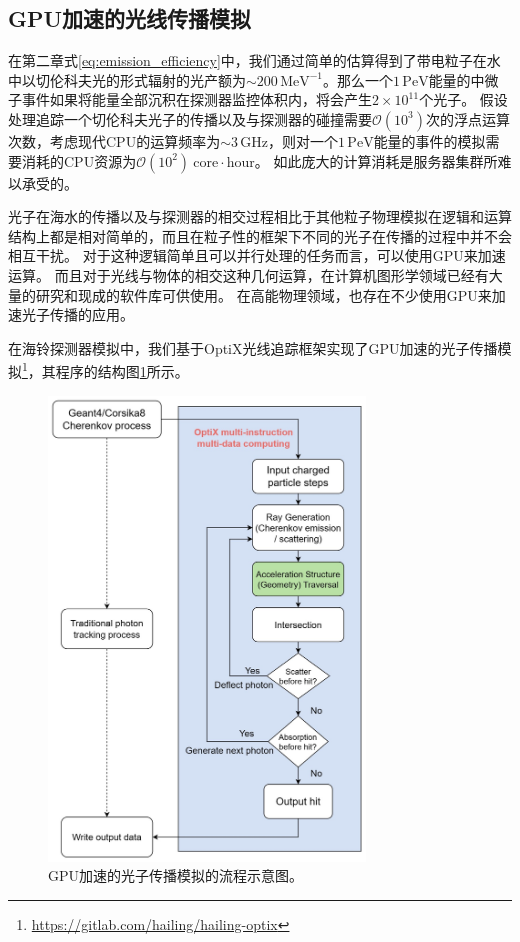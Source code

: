 \subsection{GPU加速的光线传播模拟}
\label{subsec:ray_tracing}

在第二章式\ref{eq:emission_efficiency}中，我们通过简单的估算得到了带电粒子在水中以切伦科夫光的形式辐射的光产额为$\sim 200\, \mathrm{MeV}^{-1}$。那么一个$1\,\mathrm{PeV}$能量的中微子事件如果将能量全部沉积在探测器监控体积内，将会产生$2 \times 10^{11}$个光子。
假设处理追踪一个切伦科夫光子的传播以及与探测器的碰撞需要$\mathcal{O}(10^3)$次的浮点运算次数，考虑现代CPU的运算频率为$\sim 3\,\mathrm{GHz}$，则对一个$1\,\mathrm{PeV}$能量的事件的模拟需要消耗的CPU资源为$\mathcal{O}(10^2) ~ \mathrm{core \cdot hour}$。
如此庞大的计算消耗是服务器集群所难以承受的。

光子在海水的传播以及与探测器的相交过程相比于其他粒子物理模拟在逻辑和运算结构上都是相对简单的，而且在粒子性的框架下不同的光子在传播的过程中并不会相互干扰。
对于这种逻辑简单且可以并行处理的任务而言，可以使用GPU来加速运算。
而且对于光线与物体的相交这种几何运算，在计算机图形学领域已经有大量的研究和现成的软件库可供使用\cite{RT_gems:2021}。
在高能物理领域，也存在不少使用GPU来加速光子传播的应用\cite{Dmitry_PPC:2013, Dmitry_PPC:2022, Opticks:2019, CORSIKA8_GPU:2021}。

在海铃探测器模拟中，我们基于\textsf{OptiX}光线追踪框架实现了GPU加速的光子传播模拟\footnote{\url{https://gitlab.com/hailing/hailing-optix}}，其程序的结构图\ref{fig:RT_flow_chart}所示。

\begin{figure}[!htb]
\centering
    \includegraphics[width=0.75\textwidth]{img/RT_flow_chart.jpg}
    \caption{GPU加速的光子传播模拟的流程示意图。}
    \label{fig:RT_flow_chart}
\end{figure}

